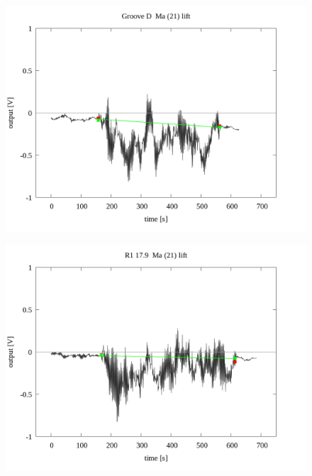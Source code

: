 \documentclass[a4paper]{jsarticle}
\begin{document}
\begin{figure}[htbp]
    \footnotesize
    \begin{center}
        \includegraphics[width=140mm]{../../../../33_result/210806/moving_average/21/lift/03/Groove_D_ma(21)_lift_03.png}
    \end{center}
\end{figure}

\begin{figure}[htbp]
    \footnotesize
    \begin{center}
        \includegraphics[width=140mm]{../../../../33_result/210806/moving_average/21/lift/03/R1_17.9_ma(21)_lift_03.png}
    \end{center}
\end{figure}
\end{document}
